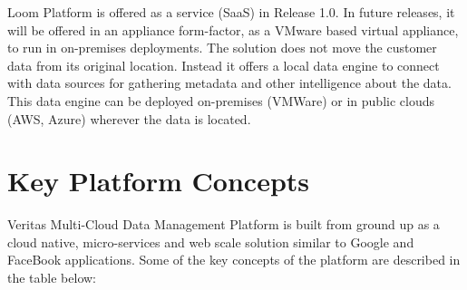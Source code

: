 \documentclass[letterpaper,10pt,english]{sphinxhowto}
\begin{document}
Loom Platform is offered as a service (SaaS) in Release 1.0. In future releases, it will be offered in an appliance form-factor, as a VMware based virtual appliance, to run in on-premises deployments. The solution does not  move the customer data from its original location. Instead it offers a local data engine to connect with data sources for gathering metadata and other intelligence about the data. This data engine can be deployed on-premises (VMWare) or in public clouds (AWS, Azure) wherever the data is located.


\section{Key Platform Concepts}
\label{\detokenize{col/ds/mcdmp_ds_alpha1:key-platform-concepts}}
Veritas Multi-Cloud Data Management Platform is built from ground up as a cloud native, micro-services and web scale solution similar to Google and FaceBook applications. Some of the key concepts of the platform are described in the table below:
\end{document}
